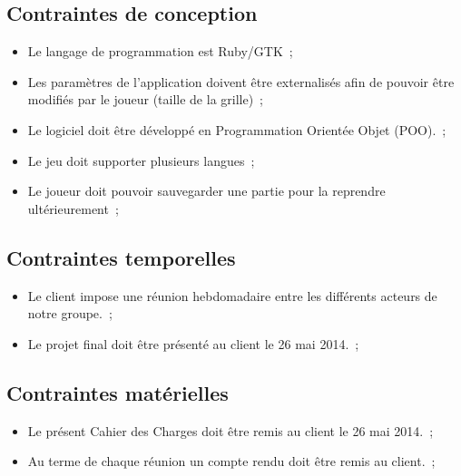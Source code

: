 \documentclass[11pt]{article}
\begin{document}
\subsection{Contraintes de conception}


\begin{itemize}
   \item Le langage de programmation est Ruby/GTK~;
   \item Les paramètres de l’application doivent être externalisés afin de pouvoir être modifiés par le joueur (taille
       de la grille)~;
   \item Le logiciel doit être développé en Programmation Orientée Objet (POO).~;
   \item Le jeu doit supporter plusieurs langues~;
   \item Le joueur doit pouvoir sauvegarder une partie pour la reprendre ultérieurement~;
\end{itemize}




\subsection{Contraintes temporelles}


\begin{itemize}
    \item Le client impose une réunion hebdomadaire entre les différents acteurs de notre groupe.~;
    \item Le projet final doit être présenté au client le 26 mai 2014.~;
\end{itemize}




\subsection{Contraintes matérielles}


\begin{itemize}
    \item Le présent Cahier des Charges doit être remis au client le 26 mai 2014.~;
    \item Au terme de chaque réunion un compte rendu doit être remis au client.~;
\end{itemize}


\end{document}
